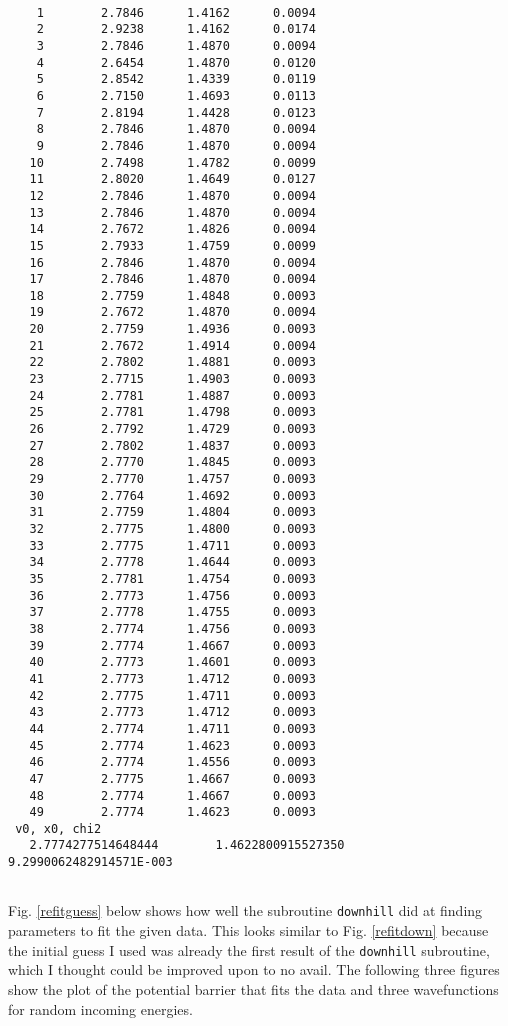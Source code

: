 \documentclass[12pt]{article}
\begin{document}
\begin{lstlisting}[frame=single,caption={{\tt elpot.f90}},label=output2]

    1        2.7846      1.4162      0.0094
    2        2.9238      1.4162      0.0174
    3        2.7846      1.4870      0.0094
    4        2.6454      1.4870      0.0120
    5        2.8542      1.4339      0.0119
    6        2.7150      1.4693      0.0113
    7        2.8194      1.4428      0.0123
    8        2.7846      1.4870      0.0094
    9        2.7846      1.4870      0.0094
   10        2.7498      1.4782      0.0099
   11        2.8020      1.4649      0.0127
   12        2.7846      1.4870      0.0094
   13        2.7846      1.4870      0.0094
   14        2.7672      1.4826      0.0094
   15        2.7933      1.4759      0.0099
   16        2.7846      1.4870      0.0094
   17        2.7846      1.4870      0.0094
   18        2.7759      1.4848      0.0093
   19        2.7672      1.4870      0.0094
   20        2.7759      1.4936      0.0093
   21        2.7672      1.4914      0.0094
   22        2.7802      1.4881      0.0093
   23        2.7715      1.4903      0.0093
   24        2.7781      1.4887      0.0093
   25        2.7781      1.4798      0.0093
   26        2.7792      1.4729      0.0093
   27        2.7802      1.4837      0.0093
   28        2.7770      1.4845      0.0093
   29        2.7770      1.4757      0.0093
   30        2.7764      1.4692      0.0093
   31        2.7759      1.4804      0.0093
   32        2.7775      1.4800      0.0093
   33        2.7775      1.4711      0.0093
   34        2.7778      1.4644      0.0093
   35        2.7781      1.4754      0.0093
   36        2.7773      1.4756      0.0093
   37        2.7778      1.4755      0.0093
   38        2.7774      1.4756      0.0093
   39        2.7774      1.4667      0.0093
   40        2.7773      1.4601      0.0093
   41        2.7773      1.4712      0.0093
   42        2.7775      1.4711      0.0093
   43        2.7773      1.4712      0.0093
   44        2.7774      1.4711      0.0093
   45        2.7774      1.4623      0.0093
   46        2.7774      1.4556      0.0093
   47        2.7775      1.4667      0.0093
   48        2.7774      1.4667      0.0093
   49        2.7774      1.4623      0.0093
 v0, x0, chi2
   2.7774277514648444        1.4622800915527350        9.2990062482914571E-003
   
\end{lstlisting}

Fig. \ref{refitguess} below shows how well the subroutine {\tt downhill} did at finding parameters to fit the given data.  This looks similar to Fig. \ref{refitdown} because the initial guess I used was already the first result of the {\tt downhill} subroutine, which I thought could be improved upon to no avail.  The following three figures show the plot of the potential barrier that fits the data and three wavefunctions for random incoming energies.
\end{document}
